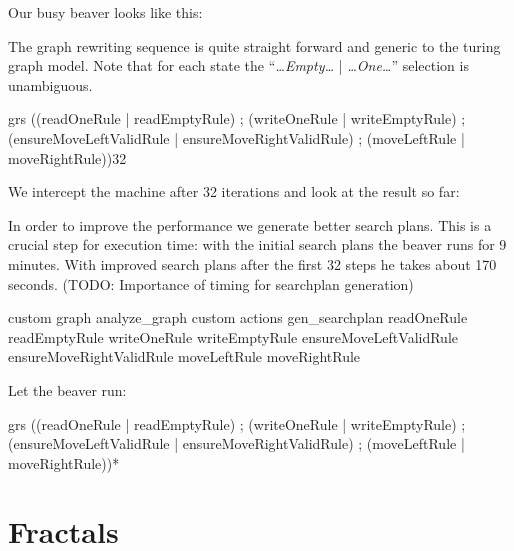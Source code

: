 Our busy beaver looks like this:
\begin{center}
\end{center}
The graph rewriting sequence is quite straight forward and generic to the turing graph model. Note that for each state the ``\emph{\dots Empty\dots} | \emph{\dots One\dots}'' selection is unambiguous.
\begin{grshell}[firstnumber=last]
  grs ((readOneRule | readEmptyRule) ; (writeOneRule | writeEmptyRule) ; (ensureMoveLeftValidRule | ensureMoveRightValidRule) ; (moveLeftRule | moveRightRule)){32}

\end{grshell}
We intercept the machine after 32 iterations and look at the result so far:
\begin{center}
\end{center}
In order to improve the performance we generate better search plans. This is a crucial step for execution time: with the initial search plans the beaver runs for 9 minutes. With improved search plans after the first 32 steps he takes about 170 seconds. (TODO: Importance of timing for searchplan generation)
\begin{grshell}[firstnumber=last]
custom graph analyze_graph
custom actions gen_searchplan readOneRule readEmptyRule writeOneRule writeEmptyRule ensureMoveLeftValidRule ensureMoveRightValidRule moveLeftRule moveRightRule

\end{grshell}

Let the beaver run:
\begin{grshell}[firstnumber=last]
  grs ((readOneRule | readEmptyRule) ; (writeOneRule | writeEmptyRule) ; (ensureMoveLeftValidRule | ensureMoveRightValidRule) ; (moveLeftRule | moveRightRule))*

\end{grshell}

\section{Fractals}
 
